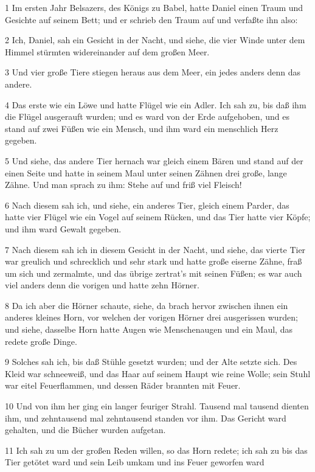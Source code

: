 \par 1 Im ersten Jahr Belsazers, des Königs zu Babel, hatte Daniel einen Traum und Gesichte auf seinem Bett; und er schrieb den Traum auf und verfaßte ihn also:
\par 2 Ich, Daniel, sah ein Gesicht in der Nacht, und siehe, die vier Winde unter dem Himmel stürmten widereinander auf dem großen Meer.
\par 3 Und vier große Tiere stiegen heraus aus dem Meer, ein jedes anders denn das andere.
\par 4 Das erste wie ein Löwe und hatte Flügel wie ein Adler. Ich sah zu, bis daß ihm die Flügel ausgerauft wurden; und es ward von der Erde aufgehoben, und es stand auf zwei Füßen wie ein Mensch, und ihm ward ein menschlich Herz gegeben.
\par 5 Und siehe, das andere Tier hernach war gleich einem Bären und stand auf der einen Seite und hatte in seinem Maul unter seinen Zähnen drei große, lange Zähne. Und man sprach zu ihm: Stehe auf und friß viel Fleisch!
\par 6 Nach diesem sah ich, und siehe, ein anderes Tier, gleich einem Parder, das hatte vier Flügel wie ein Vogel auf seinem Rücken, und das Tier hatte vier Köpfe; und ihm ward Gewalt gegeben.
\par 7 Nach diesem sah ich in diesem Gesicht in der Nacht, und siehe, das vierte Tier war greulich und schrecklich und sehr stark und hatte große eiserne Zähne, fraß um sich und zermalmte, und das übrige zertrat's mit seinen Füßen; es war auch viel anders denn die vorigen und hatte zehn Hörner.
\par 8 Da ich aber die Hörner schaute, siehe, da brach hervor zwischen ihnen ein anderes kleines Horn, vor welchen der vorigen Hörner drei ausgerissen wurden; und siehe, dasselbe Horn hatte Augen wie Menschenaugen und ein Maul, das redete große Dinge.
\par 9 Solches sah ich, bis daß Stühle gesetzt wurden; und der Alte setzte sich. Des Kleid war schneeweiß, und das Haar auf seinem Haupt wie reine Wolle; sein Stuhl war eitel Feuerflammen, und dessen Räder brannten mit Feuer.
\par 10 Und von ihm her ging ein langer feuriger Strahl. Tausend mal tausend dienten ihm, und zehntausend mal zehntausend standen vor ihm. Das Gericht ward gehalten, und die Bücher wurden aufgetan.
\par 11 Ich sah zu um der großen Reden willen, so das Horn redete; ich sah zu bis das Tier getötet ward und sein Leib umkam und ins Feuer geworfen ward
